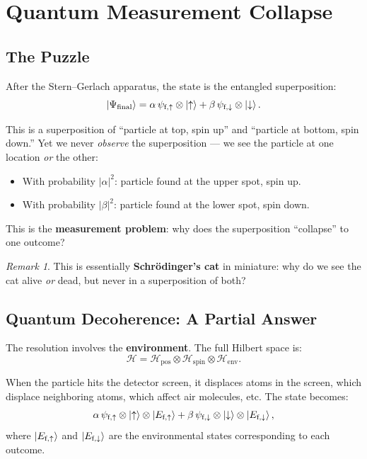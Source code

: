 \documentclass[11pt,a4paper]{article}
\theoremstyle{definition}
\theoremstyle{plain}
\theoremstyle{remark}
\newtheorem{remark}{Remark}[section]
\begin{document}
\section{Quantum Measurement Collapse}

\subsection{The Puzzle}

After the Stern--Gerlach apparatus, the state is the entangled superposition:
\[
    \ket{\Psi_{\text{final}}} = \alpha\,\psi_{\text{f},\uparrow}\otimes\ket{\uparrow} + \beta\,\psi_{\text{f},\downarrow}\otimes\ket{\downarrow}.
\]

This is a superposition of ``particle at top, spin up'' and ``particle at bottom, spin down.'' Yet we never \emph{observe} the superposition --- we see the particle at one location \emph{or} the other:
\begin{itemize}
    \item With probability $|\alpha|^2$: particle found at the upper spot, spin up.
    \item With probability $|\beta|^2$: particle found at the lower spot, spin down.
\end{itemize}

This is the \textbf{measurement problem}: why does the superposition ``collapse'' to one outcome?

\begin{remark}
    This is essentially \textbf{Schr\"odinger's cat} in miniature: why do we see the cat alive \emph{or} dead, but never in a superposition of both?
\end{remark}

\subsection{Quantum Decoherence: A Partial Answer}

The resolution involves the \textbf{environment}. The full Hilbert space is:
\[
    \mathcal{H} = \mathcal{H}_{\text{pos}} \otimes \mathcal{H}_{\text{spin}} \otimes \mathcal{H}_{\text{env}}.
\]

When the particle hits the detector screen, it displaces atoms in the screen, which displace neighboring atoms, which affect air molecules, etc. The state becomes:
\[
    \alpha\,\psi_{\text{f},\uparrow}\otimes\ket{\uparrow}\otimes\ket{E_{\text{f},\uparrow}} + \beta\,\psi_{\text{f},\downarrow}\otimes\ket{\downarrow}\otimes\ket{E_{\text{f},\downarrow}},
\]
where $\ket{E_{\text{f},\uparrow}}$ and $\ket{E_{\text{f},\downarrow}}$ are the environmental states corresponding to each outcome.
\end{document}
